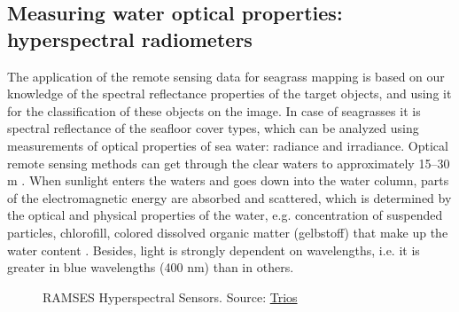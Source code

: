 \documentclass[10pt, a4paper]{article}
\begin{document}
\subsection[Measuring water optical properties]{Measuring water optical properties: \\hyperspectral radiometers}
The application of the remote sensing data for seagrass mapping is based on our knowledge of the
spectral reflectance properties of the target objects, and using it for the classification of these objects
on the image. In case of seagrasses it is spectral reflectance of the seafloor cover types, which can be
analyzed using measurements of optical properties of sea water: radiance and irradiance.
Optical remote sensing methods can get through the clear waters to approximately 15–30 m \cite{Mumby04}\label{Mumby04}.
When sunlight enters the waters and goes down into the water column, parts of the
electromagnetic energy are absorbed and scattered, which is determined by the optical and physical
properties of the water, e.g. concentration of suspended particles, chlorofill, colored dissolved
organic matter (gelbstoff) that make up the water content \cite{Ackleson2003}\label{Ackleson, 2003}. Besides, light is strongly
dependent on wavelengths, i.e. it is greater in blue wavelengths (400 nm) than in others.

\begin{figure}
	\centering
	\caption{RAMSES Hyperspectral Sensors. Source: \href{http://www.trios.de}{Trios}}
	\label{fig:2.1}
\end{figure}
\end{document}
